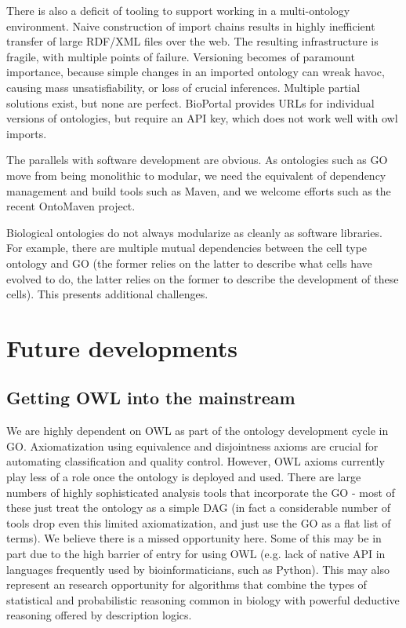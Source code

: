 \documentclass{llncs}
\begin{document}
There is also a deficit of tooling to support working in a
multi-ontology environment. Naive construction of import chains
results in highly inefficient transfer of large RDF/XML files over the
web. The resulting infrastructure is fragile, with multiple points of
failure. Versioning becomes of paramount importance, because simple
changes in an imported ontology can wreak havoc, causing mass
unsatisfiability, or loss of crucial inferences. Multiple partial
solutions exist, but none are perfect. BioPortal provides URLs for
individual versions of ontologies, but require an API key, which does
not work well with owl imports.

The parallels with software development are obvious. As ontologies
such as GO move from being monolithic to modular, we need the
equivalent of dependency management and build tools such as Maven, and
we welcome efforts such as the recent OntoMaven
project\cite{paschke2013ontomaven}.

Biological ontologies do not always modularize as cleanly as software
libraries. For example, there are multiple mutual dependencies between
the cell type ontology and GO (the former relies on the latter to
describe what cells have evolved to do, the latter relies on the
former to describe the development of these cells). This presents
additional challenges.



\section{Future developments}

\subsection{Getting OWL into the mainstream}

We are highly dependent on OWL as part of the ontology development
cycle in GO. Axiomatization using equivalence and disjointness
axioms are crucial for automating classification and quality
control. However, OWL axioms currently play less of a role once the ontology
is deployed and used. There are large numbers of highly sophisticated
analysis tools that incorporate the GO - most of these just treat the
ontology as a simple DAG (in fact a considerable number of tools drop
even this limited axiomatization, and just use the GO as a flat list
of terms). We believe there is a missed opportunity here. Some of this
may be in part due to the high barrier of entry for using OWL
(e.g. lack of native API in languages frequently used by
bioinformaticians, such as Python). This may also represent an
research opportunity for algorithms that combine the types of
statistical and probabilistic reasoning common in biology with
powerful deductive reasoning offered by description logics.
\end{document}
